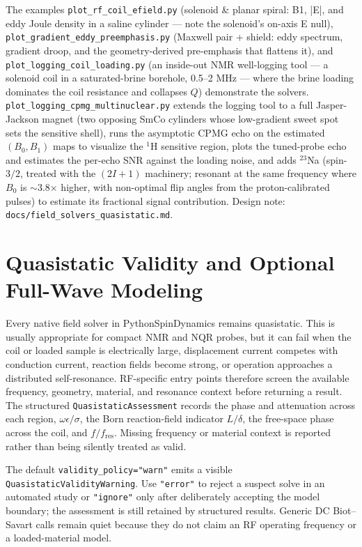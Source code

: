 \documentclass[11pt,oneside]{report}
\newcommand{\code}[1]{\texttt{#1}}
\begin{document}
The examples \code{plot\_rf\_coil\_efield.py} (solenoid \& planar spiral: B1, |E|,
and eddy Joule density in a saline cylinder --- note the solenoid's on-axis E
null), \code{plot\_gradient\_eddy\_preemphasis.py} (Maxwell pair + shield: eddy
spectrum, gradient droop, and the geometry-derived pre-emphasis that flattens it),
and \code{plot\_logging\_coil\_loading.py} (an inside-out NMR well-logging tool ---
a solenoid coil in a saturated-brine borehole, 0.5--2 MHz --- where the brine
loading dominates the coil resistance and collapses \(Q\)) demonstrate the
solvers. \code{plot\_logging\_cpmg\_multinuclear.py} extends the logging tool to a
full Jasper-Jackson magnet (two opposing SmCo cylinders whose low-gradient
sweet spot sets the sensitive shell), runs the asymptotic CPMG echo on the
estimated \((B_0, B_1)\) maps to visualize the \(^1\)H sensitive region, plots the
tuned-probe echo and estimates the per-echo SNR against the loading noise, and
adds \(^{23}\)Na (spin-\(3/2\), treated with the \((2I+1)\) machinery; resonant at
the same frequency where \(B_0\) is \(\sim\)3.8\(\times\) higher, with non-optimal
flip angles from the proton-calibrated pulses) to estimate its fractional signal
contribution. Design note: \code{docs/field\_solvers\_quasistatic.md}.

\section{Quasistatic Validity and Optional Full-Wave Modeling}
\label{sec:fields-fullwave}

Every native field solver in PythonSpinDynamics remains quasistatic. This is
usually appropriate for compact NMR and NQR probes, but it can fail when the
coil or loaded sample is electrically large, displacement current competes with
conduction current, reaction fields become strong, or operation approaches a
distributed self-resonance. RF-specific entry points therefore screen the
available frequency, geometry, material, and resonance context before returning
a result. The structured \code{QuasistaticAssessment} records the phase and
attenuation across each region, \(\omega\epsilon/\sigma\), the Born reaction-field
indicator \(L/\delta\), the free-space phase across the coil, and
\(f/f_{\mathrm{res}}\). Missing frequency or material context is reported rather
than being silently treated as valid.

The default \code{validity\_policy="warn"} emits a visible
\code{QuasistaticValidityWarning}. Use \code{"error"} to reject a suspect solve
in an automated study or \code{"ignore"} only after deliberately accepting the
model boundary; the assessment is still retained by structured results. Generic
DC Biot--Savart calls remain quiet because they do not claim an RF operating
frequency or a loaded-material model.
\end{document}
